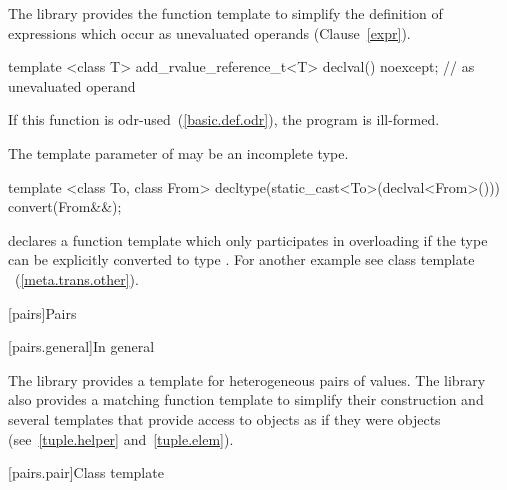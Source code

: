 \pnum
The library provides the function template  to simplify the definition of
expressions which occur as unevaluated operands (Clause~\ref{expr}).

%
\begin{itemdecl}
template <class T>
  add_rvalue_reference_t<T> declval() noexcept;  // as unevaluated operand
\end{itemdecl}

\begin{itemdescr}
\pnum
\notes If this function is odr-used~(\ref{basic.def.odr}), the program is ill-formed.

\pnum
\notes The template parameter  of  may be an incomplete type.

\enterexample
\begin{codeblock}
template <class To, class From>
  decltype(static_cast<To>(declval<From>())) convert(From&&);
\end{codeblock}

declares a function template  which only participates in overloading if the
type  can be explicitly converted to type . For another example see class
template ~(\ref{meta.trans.other}).
\exitexample
\end{itemdescr}

[pairs]{Pairs}

[pairs.general]{In general}

\pnum
The library provides a template for heterogeneous pairs of values.
The library also provides a matching function template to simplify
their construction and several templates that provide access to 
objects as if they were  objects (see~\ref{tuple.helper}
and~\ref{tuple.elem}).%
%
%
%

[pairs.pair]{Class template }

